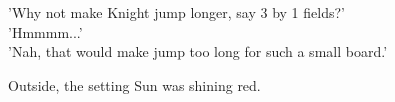 \noindent
'Why not make Knight jump longer, say 3 by 1 fields?' \\
'Hmmmm...' \\
'Nah, that would make jump too long for such a small board.'

Outside, the setting Sun was shining red.

\vspace*{0.03\textheight}
\begin{flushright}
\parbox{0.6\textwidth}{
\emph{ \hspace*{\fill}{late November, 1975} \\
\hspace*{\fill}{Bednja, Croatia} } }
\end{flushright}

\clearpage %
